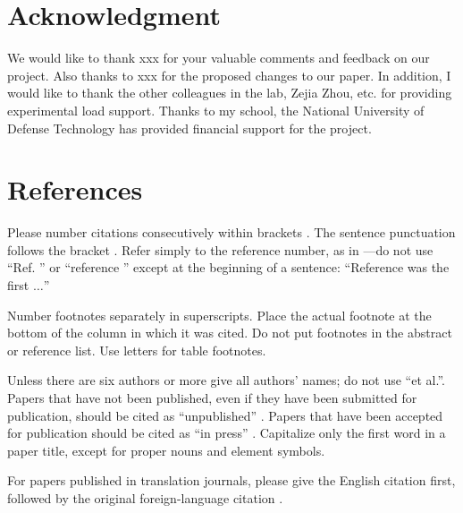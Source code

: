 \documentclass[conference]{IEEEtran}
\begin{document}
\section*{Acknowledgment}

We would like to thank xxx for your valuable comments and feedback on our project. Also thanks to xxx for the proposed changes to our paper. In addition, I would like to thank the other colleagues in the lab, Zejia Zhou, etc. for providing experimental load support. Thanks to my school, the National University of Defense Technology has provided financial support for the project.

\section*{References}

Please number citations consecutively within brackets \cite{b1}. The
sentence punctuation follows the bracket \cite{b2}. Refer simply to the reference
number, as in \cite{b3}---do not use ``Ref. \cite{b3}'' or ``reference \cite{b3}'' except at
the beginning of a sentence: ``Reference \cite{b3} was the first $\ldots$''

Number footnotes separately in superscripts. Place the actual footnote at
the bottom of the column in which it was cited. Do not put footnotes in the
abstract or reference list. Use letters for table footnotes.

Unless there are six authors or more give all authors' names; do not use
``et al.''. Papers that have not been published, even if they have been
submitted for publication, should be cited as ``unpublished'' \cite{b4}. Papers
that have been accepted for publication should be cited as ``in press'' \cite{b5}.
Capitalize only the first word in a paper title, except for proper nouns and
element symbols.

For papers published in translation journals, please give the English
citation first, followed by the original foreign-language citation \cite{b6}.
\end{document}
